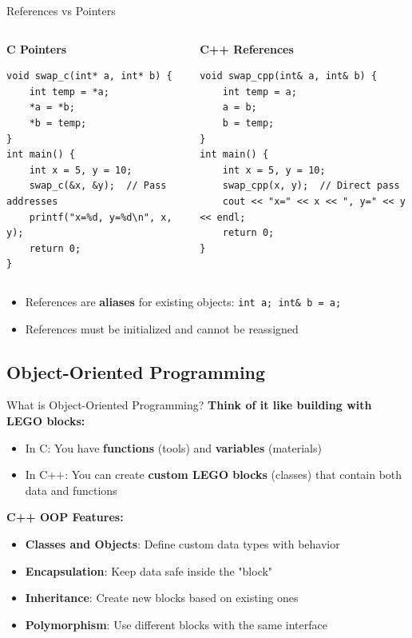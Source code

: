 \begin{frame}[fragile]{ References vs Pointers}
	\begin{columns}
		\begin{column}{0.5\textwidth}
			\textbf{C Pointers}
			\begin{verbatim}
void swap_c(int* a, int* b) {
    int temp = *a;
    *a = *b;
    *b = temp;
}
int main() {
    int x = 5, y = 10;
    swap_c(&x, &y);  // Pass addresses
    printf("x=%d, y=%d\n", x, y);
    return 0;
}
			\end{verbatim}
		\end{column}
		\begin{column}{0.5\textwidth}
			\textbf{C++ References}
			\begin{verbatim}
void swap_cpp(int& a, int& b) {
    int temp = a;
    a = b;
    b = temp;
}
int main() {
    int x = 5, y = 10;
    swap_cpp(x, y);  // Direct pass
    cout << "x=" << x << ", y=" << y << endl;
    return 0;
}
			\end{verbatim}
		\end{column}
	\end{columns}

	\vspace{0.5em}
	\begin{itemize}
        \item References are \textbf{aliases} for existing objects: \texttt{int a; int\& b = a;}
		\item References must be initialized and cannot be reassigned
	\end{itemize}
\end{frame}

\subsection{Object-Oriented Programming}
\begin{frame}[fragile]{ What is Object-Oriented Programming?}
    \textbf{Think of it like building with LEGO blocks:}
    \begin{itemize}
        \item In C: You have \textbf{functions} (tools) and \textbf{variables} (materials)
        \item In C++: You can create \textbf{custom LEGO blocks} (classes) that contain both data and functions
    \end{itemize}

    \vspace{0.5em}
    \textbf{C++ OOP Features:}
    \begin{itemize}
        \item \textbf{Classes and Objects}: Define custom data types with behavior
        \item \textbf{Encapsulation}: Keep data safe inside the "block"
        \item \textbf{Inheritance}: Create new blocks based on existing ones
        \item \textbf{Polymorphism}: Use different blocks with the same interface
    \end{itemize}
\end{frame}

